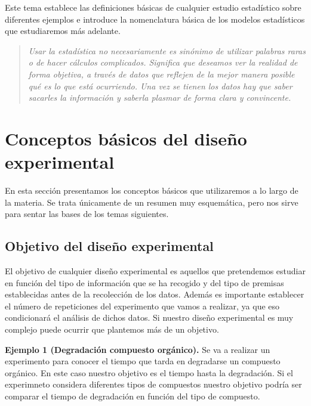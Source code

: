 \documentclass[
]{book}
\begin{document}
Este tema establece las definiciones básicas de cualquier estudio estadístico sobre diferentes ejemplos e introduce la nomenclatura básica de los modelos estadísticos que estudiaremos más adelante.

\begin{quote}
\emph{Usar la estadística no necesariamente es sinónimo de utilizar palabras raras o de hacer cálculos complicados. Significa que deseamos ver la realidad de forma objetiva, a través de datos que reflejen de la mejor manera posible qué es lo que está ocurriendo. Una vez se tienen los datos hay que saber sacarles la información y saberla plasmar de forma clara y convincente.}
\end{quote}

\hypertarget{conceptos-buxe1sicos-del-diseuxf1o-experimental}{%
\section{Conceptos básicos del diseño experimental}\label{conceptos-buxe1sicos-del-diseuxf1o-experimental}}

En esta sección presentamos los conceptos básicos que utilizaremos a lo largo de la materia. Se trata únicamente de un resumen muy esquemática, pero nos sirve para sentar las bases de los temas siguientes.

\hypertarget{objetivo-del-diseuxf1o-experimental}{%
\subsection{Objetivo del diseño experimental}\label{objetivo-del-diseuxf1o-experimental}}

El objetivo de cualquier diseño experimental es aquellos que pretendemos estudiar en función del tipo de información que se ha recogido y del tipo de premisas establecidas antes de la recolección de los datos. Además es importante establecer el número de repeticiones del experimento que vamos a realizar, ya que eso condicionará el análisis de dichos datos. Si nuestro diseño experimental es muy complejo puede ocurrir que plantemos más de un objetivo.

\textbf{Ejemplo 1 (Degradación compuesto orgánico).} Se va a realizar un experimento para conocer el tiempo que tarda en degradarse un compuesto orgánico. En este caso nuestro objetivo es el tiempo hasta la degradación. Si el experimneto considera diferentes tipos de compuestos nuestro objetivo podría ser comparar el tiempo de degradación en función del tipo de compuesto.
\end{document}
